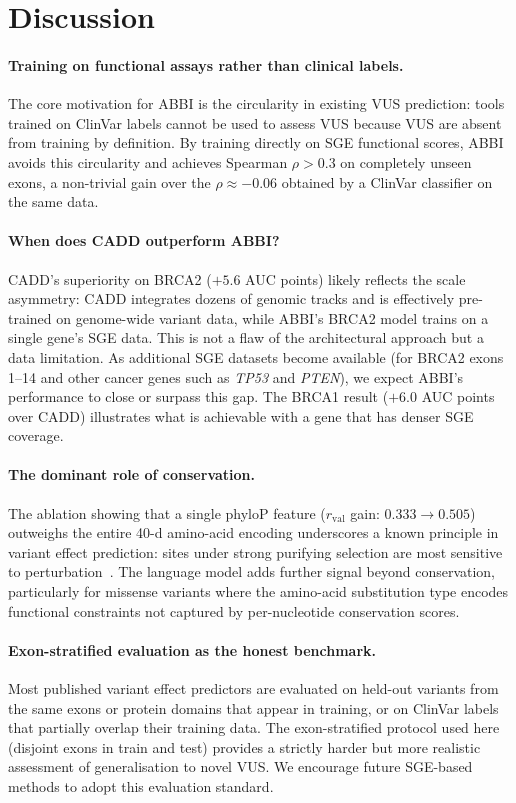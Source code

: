 \documentclass[12pt]{article}
\newcommand{\abbi}{\textsc{ABBI}}
\begin{document}
\section{Discussion}
\label{sec:discussion}

\paragraph{Training on functional assays rather than clinical labels.}
The core motivation for \abbi{} is the circularity in existing VUS prediction:
tools trained on ClinVar labels cannot be used to assess VUS because VUS are
absent from training by definition.
By training directly on SGE functional scores, \abbi{} avoids this circularity and
achieves Spearman $\rho > 0.3$ on completely unseen exons, a non-trivial gain over
the $\rho \approx -0.06$ obtained by a ClinVar classifier on the same data.

\paragraph{When does CADD outperform \abbi{}?}
CADD's superiority on BRCA2 ($+5.6$ AUC points) likely reflects the scale
asymmetry: CADD integrates dozens of genomic tracks and is effectively pre-trained on
genome-wide variant data, while \abbi{}'s BRCA2 model trains on a single gene's SGE
data.
This is not a flaw of the architectural approach but a data limitation.
As additional SGE datasets become available (for BRCA2 exons 1--14 and other cancer
genes such as \emph{TP53} and \emph{PTEN}), we expect \abbi{}'s performance to close
or surpass this gap.
The BRCA1 result ($+6.0$ AUC points over CADD) illustrates what is achievable with
a gene that has denser SGE coverage.

\paragraph{The dominant role of conservation.}
The ablation showing that a single phyloP feature ($r_{\text{val}}$ gain: $0.333
\to 0.505$) outweighs the entire 40-d amino-acid encoding underscores a known
principle in variant effect prediction: sites under strong purifying selection are most
sensitive to perturbation~\citep{phylop}.
The language model adds further signal beyond conservation, particularly for missense
variants where the amino-acid substitution type encodes functional constraints not
captured by per-nucleotide conservation scores.

\paragraph{Exon-stratified evaluation as the honest benchmark.}
Most published variant effect predictors are evaluated on held-out variants from
the same exons or protein domains that appear in training, or on ClinVar labels
that partially overlap their training data.
The exon-stratified protocol used here (disjoint exons in train and test) provides
a strictly harder but more realistic assessment of generalisation to novel VUS.
We encourage future SGE-based methods to adopt this evaluation standard.
\end{document}

